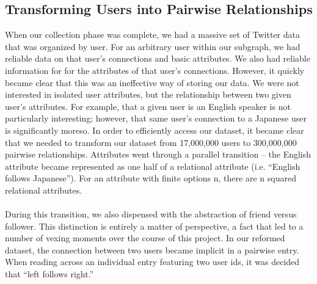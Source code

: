\subsection{Transforming Users into Pairwise Relationships}
When our collection phase was complete, we had a massive set of Twitter data that was organized by user.  For an arbitrary user within our subgraph, we had reliable data on that user's connections and basic attributes.  We also had reliable information for for the attributes of that user's connections.  However, it quickly became clear that this was an ineffective way of storing our data.  We were not interested in isolated user attributes, but the relationship between two given user's attributes.  For example, that a given user is an English speaker is not particularly interesting; however, that same user's connection to a Japanese user is significantly moreso.  In order to efficiently access our dataset, it became clear that we needed to transform our dataset from 17,000,000 users to 300,000,000 pairwise relationships.  Attributes went through a parallel transition -- the English attribute became represented as one half of a relational attribute (i.e. ``English follows Japanese'').  For an attribute with finite options n, there are n squared relational attributes.
\\\\
During this transition, we also dispensed with the abstraction of friend versus follower.  This distinction is entirely a matter of perspective, a fact that led to a number of vexing moments over the course of this project.  In our reformed dataset, the connection between two users became implicit in a pairwise entry.  When reading across an individual entry featuring two user ids, it was decided that ``left follows right.'' 

